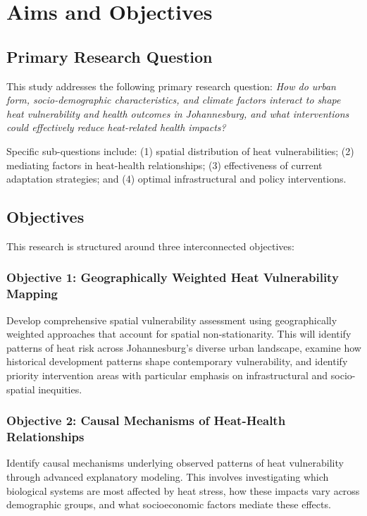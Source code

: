 \section{Aims and Objectives}
\graphicspath{{./images/}}

\subsection{Primary Research Question}
This study addresses the following primary research question: \textit{How do urban form, socio-demographic characteristics, and climate factors interact to shape heat vulnerability and health outcomes in Johannesburg, and what interventions could effectively reduce heat-related health impacts?}

Specific sub-questions include: (1) spatial distribution of heat vulnerabilities; (2) mediating factors in heat-health relationships; (3) effectiveness of current adaptation strategies; and (4) optimal infrastructural and policy interventions.

\subsection{Objectives}
This research is structured around three interconnected objectives:

\subsubsection{Objective 1: Geographically Weighted Heat Vulnerability Mapping}
Develop comprehensive spatial vulnerability assessment using geographically weighted approaches that account for spatial non-stationarity. This will identify patterns of heat risk across Johannesburg's diverse urban landscape, examine how historical development patterns shape contemporary vulnerability, and identify priority intervention areas with particular emphasis on infrastructural and socio-spatial inequities.

\subsubsection{Objective 2: Causal Mechanisms of Heat-Health Relationships}
Identify causal mechanisms underlying observed patterns of heat vulnerability through advanced explanatory modeling. This involves investigating which biological systems are most affected by heat stress, how these impacts vary across demographic groups, and what socioeconomic factors mediate these effects.

